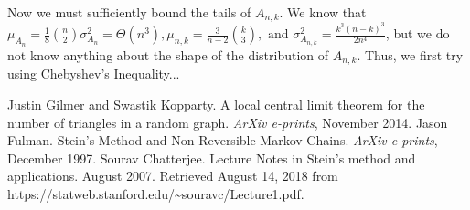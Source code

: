 \documentclass[12pt]{article} %
\theoremstyle{definition}
\theoremstyle{remark}
\begin{document}
Now we must sufficiently bound the tails of $A_{n,k}$. We know that $\mu_{A_n} = \frac{1}{8}{n\choose 2} \sigma_{A_n}^2 = \Theta(n^3), \mu_{n,k} = \frac{3}{n-2} {k\choose 3}, \text{ and } \sigma_{A_{n,k}}^2 = \frac{k^3(n-k)^3}{2n^4}$, but we do not know anything about the shape of the distribution of $A_{n,k}$. 
Thus, we first try using Chebyshev's Inequality...



\begin{thebibliography}{0}
			Justin Gilmer and Swastik Kopparty.
			A local central limit theorem for the number of triangles in a random graph.
			\emph{ArXiv e-prints},
			November 2014.
			Jason Fulman.
			Stein's Method and Non-Reversible Markov Chains.
			\emph{ArXiv e-prints},
			December 1997.
			Sourav Chatterjee.
			Lecture Notes in Stein's method and applications.
			August 2007.
			Retrieved August 14, 2018 from https://statweb.stanford.edu/\textasciitilde{}souravc/Lecture1.pdf.
\end{thebibliography}
\end{document}
